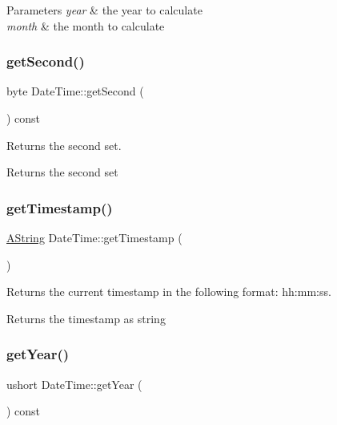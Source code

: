 \begin{DoxyParams}{Parameters}
{\em year} & the year to calculate \\
\hline
{\em month} & the month to calculate \\
\hline
\end{DoxyParams}
\mbox{\label{class_date_time_a16d1e909db200146199b6623fce55a81}} 
\subsubsection{\texorpdfstring{getSecond()}{getSecond()}}
{\footnotesize\ttfamily byte Date\+Time\+::get\+Second (\begin{DoxyParamCaption}{ }\end{DoxyParamCaption}) const}



Returns the second set. 

\begin{DoxyReturn}{Returns}
the second set 
\end{DoxyReturn}
\mbox{\label{class_date_time_a272b1eca3f3aafc7d275ec5e8831a6ca}} 
\subsubsection{\texorpdfstring{getTimestamp()}{getTimestamp()}}
{\footnotesize\ttfamily \mbox{\hyperlink{class_a_string}{A\+String}} Date\+Time\+::get\+Timestamp (\begin{DoxyParamCaption}{ }\end{DoxyParamCaption})\hspace{0.3cm}{\ttfamily [static]}}



Returns the current timestamp in the following format\+: hh\+:mm\+:ss. 

\begin{DoxyReturn}{Returns}
the timestamp as string 
\end{DoxyReturn}
\mbox{\label{class_date_time_a5bab8648961a46a2a3cbca3868efecce}} 
\subsubsection{\texorpdfstring{getYear()}{getYear()}}
{\footnotesize\ttfamily ushort Date\+Time\+::get\+Year (\begin{DoxyParamCaption}{ }\end{DoxyParamCaption}) const}



